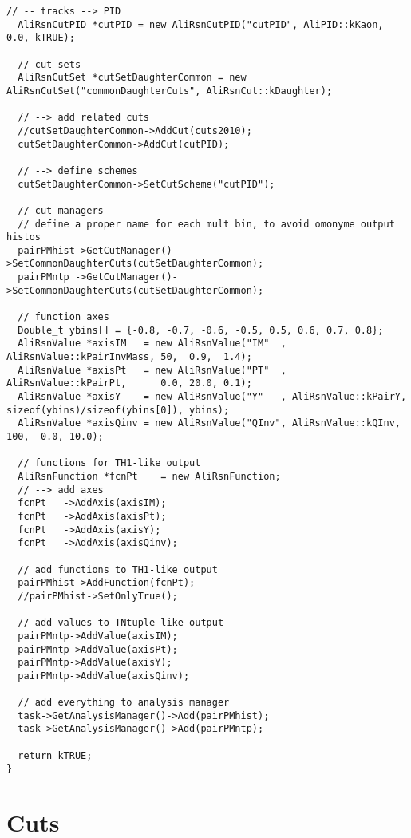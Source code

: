 \documentclass[12pt,a4paper]{article}
\begin{document}
\begin{lstlisting}[frame=single]
  // -- tracks --> PID
  AliRsnCutPID *cutPID = new AliRsnCutPID("cutPID", AliPID::kKaon, 0.0, kTRUE);
  
  // cut sets
  AliRsnCutSet *cutSetDaughterCommon = new AliRsnCutSet("commonDaughterCuts", AliRsnCut::kDaughter);

  // --> add related cuts
  //cutSetDaughterCommon->AddCut(cuts2010);
  cutSetDaughterCommon->AddCut(cutPID);

  // --> define schemes
  cutSetDaughterCommon->SetCutScheme("cutPID");
   
  // cut managers
  // define a proper name for each mult bin, to avoid omonyme output histos
  pairPMhist->GetCutManager()->SetCommonDaughterCuts(cutSetDaughterCommon);
  pairPMntp ->GetCutManager()->SetCommonDaughterCuts(cutSetDaughterCommon);

  // function axes
  Double_t ybins[] = {-0.8, -0.7, -0.6, -0.5, 0.5, 0.6, 0.7, 0.8};
  AliRsnValue *axisIM   = new AliRsnValue("IM"  , AliRsnValue::kPairInvMass, 50,  0.9,  1.4);
  AliRsnValue *axisPt   = new AliRsnValue("PT"  , AliRsnValue::kPairPt,      0.0, 20.0, 0.1);
  AliRsnValue *axisY    = new AliRsnValue("Y"   , AliRsnValue::kPairY,       sizeof(ybins)/sizeof(ybins[0]), ybins);
  AliRsnValue *axisQinv = new AliRsnValue("QInv", AliRsnValue::kQInv,       100,  0.0, 10.0);

  // functions for TH1-like output
  AliRsnFunction *fcnPt    = new AliRsnFunction;
  // --> add axes
  fcnPt   ->AddAxis(axisIM);
  fcnPt   ->AddAxis(axisPt);
  fcnPt   ->AddAxis(axisY);
  fcnPt   ->AddAxis(axisQinv);
  
  // add functions to TH1-like output
  pairPMhist->AddFunction(fcnPt);
  //pairPMhist->SetOnlyTrue();
  
  // add values to TNtuple-like output
  pairPMntp->AddValue(axisIM);
  pairPMntp->AddValue(axisPt);
  pairPMntp->AddValue(axisY);
  pairPMntp->AddValue(axisQinv);
  
  // add everything to analysis manager
  task->GetAnalysisManager()->Add(pairPMhist);
  task->GetAnalysisManager()->Add(pairPMntp);

  return kTRUE;
}
\end{lstlisting}

\section{Cuts}
\end{document}
